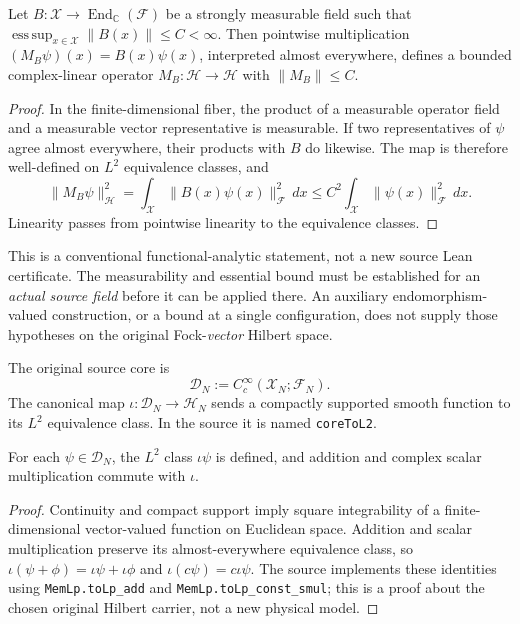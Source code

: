 \begin{proposition}\label{prop:bounded-l2-multiplier}
Let $B:\mathcal X\to\operatorname{End}_{\mathbb C}(\mathcal F)$ be a
strongly measurable field such that
$\operatorname*{ess\,sup}_{x\in\mathcal X}\|B(x)\|\leq C<\infty$.
Then pointwise multiplication
$(M_B\psi)(x)=B(x)\psi(x)$, interpreted almost everywhere,
defines a bounded complex-linear operator
$M_B:\mathscr H\to\mathscr H$ with $\|M_B\|\leq C$.
\end{proposition}
\begin{proof}
In the finite-dimensional fiber, the product of a measurable operator
field and a measurable vector representative is measurable. If two
representatives of $\psi$ agree almost everywhere, their products
with $B$ do likewise. The map is therefore well-defined on $L^2$
equivalence classes, and
\[
 \|M_B\psi\|_{\mathscr H}^{2}
 =\int_{\mathcal X}\|B(x)\psi(x)\|_{\mathcal F}^{2}\,dx
 \leq C^2\int_{\mathcal X}\|\psi(x)\|_{\mathcal F}^{2}\,dx.
\]
Linearity passes from pointwise linearity to the equivalence classes.
\end{proof}
This is a conventional functional-analytic statement, not a new source
Lean certificate. The measurability and essential bound must be established
for an \emph{actual source field} before it can be applied there. An
auxiliary endomorphism-valued construction, or a bound at a single
configuration, does not supply those hypotheses on the original
Fock-\emph{vector} Hilbert space.

\begin{definition}
The original source core is
\begin{equation}\label{eq:smooth-core}
 \mathscr D_N:=C_c^\infty(\mathcal X_N;\mathcal F_N).
\end{equation}
The canonical map $\iota:\mathscr D_N\rightarrow\mathscr H_N$ sends a
compactly supported smooth function to its $L^2$ equivalence class. In the
source it is named \texttt{coreToL2}.
\end{definition}

\begin{proposition}
For each $\psi\in\mathscr D_N$, the $L^2$ class $\iota\psi$ is defined,
and addition and complex scalar multiplication commute with $\iota$.
\end{proposition}
\begin{proof}
Continuity and compact support imply square integrability of a
finite-dimensional vector-valued function on Euclidean space. Addition and
scalar multiplication preserve its almost-everywhere equivalence class, so
$\iota(\psi+\phi)=\iota\psi+\iota\phi$ and
$\iota(c\psi)=c\iota\psi$. The source implements these identities using
\texttt{MemLp.toLp\_add} and \texttt{MemLp.toLp\_const\_smul}; this is a
proof about the chosen original Hilbert carrier, not a new physical model.
\end{proof}

